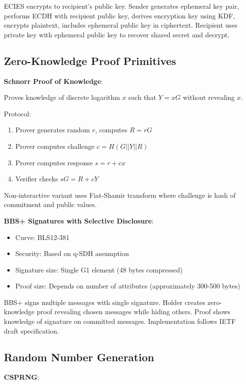 ECIES encrypts to recipient's public key. Sender generates ephemeral
key pair, performs ECDH with recipient public key, derives encryption
key using KDF, encrypts plaintext, includes ephemeral public key in
ciphertext. Recipient uses private key with ephemeral public key to
recover shared secret and decrypt.

\subsection{Zero-Knowledge Proof Primitives}

\textbf{Schnorr Proof of Knowledge}:

Proves knowledge of discrete logarithm $x$ such that $Y = xG$ without
revealing $x$.

Protocol:
\begin{enumerate}
\item Prover generates random $r$, computes $R = rG$
\item Prover computes challenge $c = H(G || Y || R)$
\item Prover computes response $s = r + cx$
\item Verifier checks $sG = R + cY$
\end{enumerate}

Non-interactive variant uses Fiat-Shamir transform where challenge is
hash of commitment and public values.

\textbf{BBS+ Signatures with Selective Disclosure}:

\begin{itemize}
\item Curve: BLS12-381
\item Security: Based on q-SDH assumption
\item Signature size: Single G1 element (48 bytes compressed)
\item Proof size: Depends on number of attributes (approximately
  300-500 bytes)
\end{itemize}

BBS+ signs multiple messages with single signature. Holder creates
zero-knowledge proof revealing chosen messages while hiding
others. Proof shows knowledge of signature on committed
messages. Implementation follows IETF draft specification.

\subsection{Random Number Generation}

\textbf{CSPRNG}:

